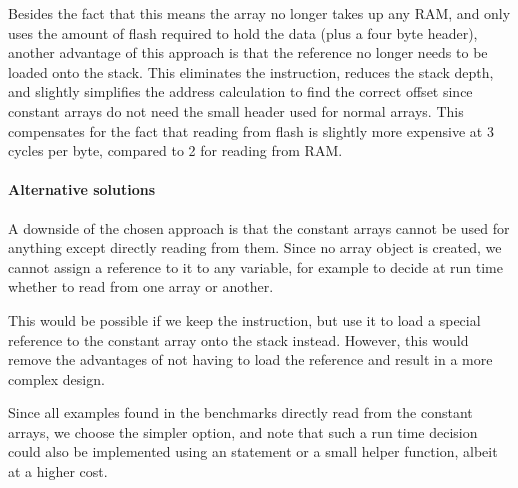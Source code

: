 Besides the fact that this means the array no longer takes up any RAM, and only uses the amount of flash required to hold the data (plus a four byte header), another advantage of this approach is that the reference no longer needs to be loaded onto the stack. This eliminates the  instruction, reduces the stack depth, and slightly simplifies the address calculation to find the correct offset since constant arrays do not need the small header used for normal arrays. This compensates for the fact that reading from flash is slightly more expensive at 3 cycles per byte, compared to 2 for reading from RAM. 

\paragraph{Alternative solutions}
A downside of the chosen approach is that the constant arrays cannot be used for anything except directly reading from them. Since no array object is created, we cannot assign a reference to it to any variable, for example to decide at run time whether to read from one array or another.

This would be possible if we keep the  instruction, but use it to load a special reference to the constant array onto the stack instead. However, this would remove the advantages of not having to load the reference and result in a more complex design.

Since all examples found in the benchmarks directly read from the constant arrays, we choose the simpler option, and note that such a run time decision could also be implemented using an  statement or a small helper function, albeit at a higher cost. 
